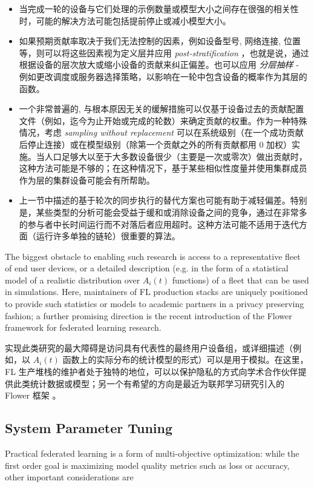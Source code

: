 \begin{itemize}
    
    \item 当完成一轮的设备与它们处理的示例数量或模型大小之间存在很强的相关性时，可能的解决方法可能包括提前停止或减小模型大小。
    \item 如果预期贡献率取决于我们无法控制的因素，例如设备型号, 网络连接, 位置等，则可以将这些因素视为定义层并应用 \textit{post-stratification} \citep{little1993poststratification}，也就是说，通过根据设备的层次放大或缩小设备的贡献来纠正偏差。也可以应用 \textit{分层抽样} - 例如更改调度或服务器选择策略，以影响在一轮中包含设备的概率作为其层的函数。
    \item 一个非常普遍的, 与根本原因无关的缓解措施可以仅基于设备过去的贡献配置文件（例如，迄今为止开始或完成的轮数）来确定贡献的权重。作为一种特殊情况，考虑 \textit{sampling without replacement} 可以在系统级别（在一个成功贡献后停止连接）或在模型级别（除第一个贡献之外的所有贡献都用 0 加权）实施。当人口足够大以至于大多数设备很少（主要是一次或零次）做出贡献时，这种方法可能是不够的；在这种情况下，基于某些相似性度量并使用集群成员作为层的集群设备可能会有所帮助。
    \item 上一节中描述的基于轮次的同步执行的替代方案也可能有助于减轻偏差。特别是，某些类型的分析可能会受益于缓和或消除设备之间的竞争，通过在非常多的参与者中长时间运行而不对落后者应用超时。这种方法可能不适用于迭代方面（运行许多单独的链轮）很重要的算法。
\end{itemize}


The biggest obstacle to enabling such research is access to a representative fleet of end user devices, or a detailed description (e.g. in the form of a statistical model of a realistic distribution over $A_i(t)$ functions) of a fleet that can be used in simulations. Here, maintainers of FL production stacks are uniquely positioned to provide such statistics or models to academic partners in a privacy preserving fashion; a further promising direction is the recent introduction of the Flower framework \citep{beutel2020flower} for federated learning research.

实现此类研究的最大障碍是访问具有代表性的最终用户设备组，或详细描述（例如，以 $A_i(t)$ 函数上的实际分布的统计模型的形式）可以是用于模拟。在这里，FL 生产堆栈的维护者处于独特的地位，可以以保护隐私的方式向学术合作伙伴提供此类统计数据或模型；另一个有希望的方向是最近为联邦学习研究引入的 Flower 框架 \citep{beutel2020flower}。

\subsection{System Parameter Tuning}
\label{subsec:systems-system-parameter-tuning}
Practical federated learning is a form of multi-objective optimization: while the first order goal is maximizing model quality metrics such as loss or accuracy, other important considerations are

